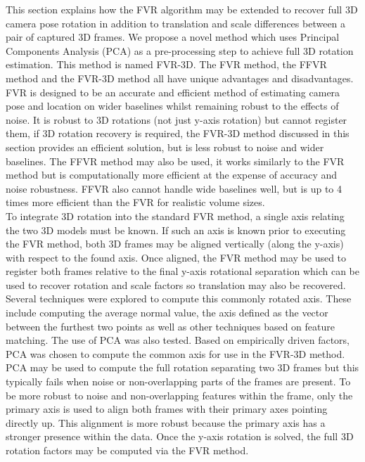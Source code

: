 
This section explains how the FVR algorithm may be extended to recover full 3D camera pose rotation in addition to translation and scale differences between a pair of captured 3D frames. We propose a novel method which uses Principal Components Analysis (PCA) as a pre-processing step to achieve full 3D rotation estimation. This method is named FVR-3D. The FVR method, the FFVR method and the FVR-3D method all have unique advantages and disadvantages. FVR is designed to be an accurate and efficient method of estimating camera pose and location on wider baselines whilst remaining robust to the effects of noise. It is robust to 3D rotations (not just y-axis rotation) but cannot register them, if 3D rotation recovery is required, the FVR-3D method discussed in this section provides an efficient solution, but is less robust to noise and wider baselines. The FFVR method may also be used, it works similarly to the FVR method but is computationally more efficient at the expense of accuracy and noise robustness. FFVR also cannot handle wide baselines well, but is up to 4 times more efficient than the FVR for realistic volume sizes. \\

To integrate 3D rotation into the standard FVR method, a single axis relating the two 3D models must be known. If such an axis is known prior to executing the FVR method, both 3D frames may be aligned vertically (along the y-axis) with respect to the found axis. Once aligned, the FVR method may be used to register both frames relative to the final y-axis rotational separation which can be used to recover rotation and scale factors so translation may also be recovered. \\

Several techniques were explored to compute this commonly rotated axis. These include computing the average normal value, the axis defined as the vector between the furthest two points as well as other techniques based on feature matching. The use of PCA was also tested. Based on empirically driven factors, PCA was chosen to compute the common axis for use in the FVR-3D method. PCA may be used to compute the full rotation separating two 3D frames but this typically fails when noise or non-overlapping parts of the frames are present. To be more robust to noise and non-overlapping features within the frame, only the primary axis is used to align both frames with their primary axes pointing directly up. This alignment is more robust because the primary axis has a stronger presence within the data. Once the y-axis rotation is solved, the full 3D rotation factors may be computed via the FVR method. \\

